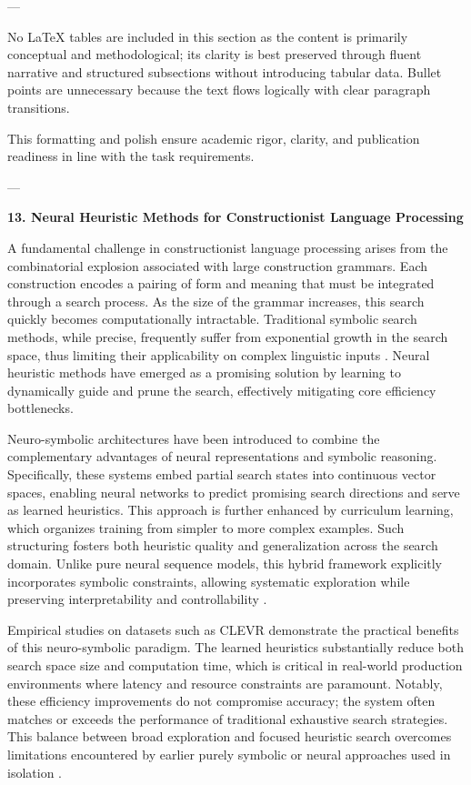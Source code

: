 \documentclass[11pt]{article}
\begin{document}
---

No LaTeX tables are included in this section as the content is primarily conceptual and methodological; its clarity is best preserved through fluent narrative and structured subsections without introducing tabular data. Bullet points are unnecessary because the text flows logically with clear paragraph transitions.

This formatting and polish ensure academic rigor, clarity, and publication readiness in line with the task requirements.

---

\textbf{13. Neural Heuristic Methods for Constructionist Language Processing}

A fundamental challenge in constructionist language processing arises from the combinatorial explosion associated with large construction grammars. Each construction encodes a pairing of form and meaning that must be integrated through a search process. As the size of the grammar increases, this search quickly becomes computationally intractable. Traditional symbolic search methods, while precise, frequently suffer from exponential growth in the search space, thus limiting their applicability on complex linguistic inputs \cite{ref40}. Neural heuristic methods have emerged as a promising solution by learning to dynamically guide and prune the search, effectively mitigating core efficiency bottlenecks.

Neuro-symbolic architectures have been introduced to combine the complementary advantages of neural representations and symbolic reasoning. Specifically, these systems embed partial search states into continuous vector spaces, enabling neural networks to predict promising search directions and serve as learned heuristics. This approach is further enhanced by curriculum learning, which organizes training from simpler to more complex examples. Such structuring fosters both heuristic quality and generalization across the search domain. Unlike pure neural sequence models, this hybrid framework explicitly incorporates symbolic constraints, allowing systematic exploration while preserving interpretability and controllability \cite{ref40}.

Empirical studies on datasets such as CLEVR demonstrate the practical benefits of this neuro-symbolic paradigm. The learned heuristics substantially reduce both search space size and computation time, which is critical in real-world production environments where latency and resource constraints are paramount. Notably, these efficiency improvements do not compromise accuracy; the system often matches or exceeds the performance of traditional exhaustive search strategies. This balance between broad exploration and focused heuristic search overcomes limitations encountered by earlier purely symbolic or neural approaches used in isolation \cite{ref40}.
\end{document}
